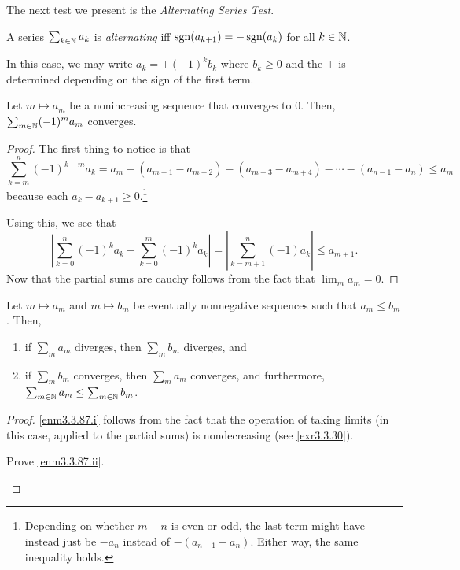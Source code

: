The next test we present is the \emph{Alternating Series Test}.
\begin{dfn}
A series $\sum _{k\in \mathbb{N}}a_k$ is \emph{alternating} iff $\operatorname{sgn} (a_{k+1})=-\operatorname{sgn} (a_k)$ for all $k\in \mathbb{N}$.
\begin{rmk}
In this case, we may write $a_k=\pm (-1)^kb_k$ where $b_k\geq 0$ and the $\pm$ is determined depending on the sign of the first term.
\end{rmk}
\end{dfn}
\begin{prp}
Let $m\mapsto a_m$ be a nonincreasing sequence that converges to $0$.  Then, $\sum _{m\in \mathbb{N}}(-1)^ma_m$ converges.
\begin{proof}
The first thing to notice is that
\begin{equation}
\sum _{k=m}^n(-1)^{k-m}a_k=a_m-(a_{m+1}-a_{m+2})-(a_{m+3}-a_{m+4})-\cdots -(a_{n-1}-a_n)\leq a_m
\end{equation}
because each $a_k-a_{k+1}\geq 0$.\footnote{Depending on whether $m-n$ is even or odd, the last term might have instead just be $-a_n$ instead of $-(a_{n-1}-a_n)$.  Either way, the same inequality holds.}

Using this, we see that
\begin{equation}
\left| \sum _{k=0}^n(-1)^ka_k-\sum _{k=0}^m(-1)^ka_k\right| =\left| \sum _{k=m+1}^n(-1)a_k\right| \leq a_{m+1}.
\end{equation}
Now that the partial sums are cauchy follows from the fact that $\lim _ma_m=0$.
\end{proof}
\end{prp}
\begin{prp}
Let $m\mapsto a_m$ and $m\mapsto b_m$ be eventually nonnegative sequences such that $a_m\leq b_m$.  Then,
\begin{enumerate}
\item \label{enm3.3.87.i}if $\sum _ma_m$ diverges, then $\sum _mb_m$ diverges, and
\item \label{enm3.3.87.ii}if $\sum _mb_m$ converges, then $\sum _ma_m$ converges, and furthermore, $\sum _{m\in \mathbb{N}}a_m\leq \sum _{m\in \mathbb{N}}b_m$.
\end{enumerate}
\begin{proof}
\ref{enm3.3.87.i} follows from the fact that the operation of taking limits (in this case, applied to the partial sums) is nondecreasing (see \cref{exr3.3.30}).
\begin{exr}
Prove \ref{enm3.3.87.ii}.
\end{exr}
\end{proof}
\end{prp}
